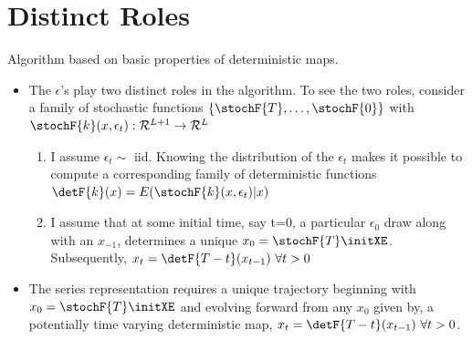 \documentclass[12pt]{article}
\begin{document}
\section{Distinct Roles}
\label{sec:distinct-roles}



  {Algorithm based on basic properties of deterministic maps.}
  \begin{itemize}
  \item     The $\epsilon$'s  play two distinct roles in the algorithm.
To see the two roles, consider a family of stochastic functions 
$\{\stochF{T},\ldots,\stochF{0}\}$ with 
$\stochF{k}(x,\epsilon_t): {\mathcal{R}}^{L+1} \rightarrow \mathcal{R}^L$ 
    \begin{enumerate}
\item I assume  $\epsilon_t \sim $ iid. Knowing the distribution 
of the $\epsilon_t$ makes it possible to compute 
a corresponding family of deterministic functions $\detF{k}(x)=E( \stochF{k}(x,\epsilon_t)|x) $
    \item I assume that at some initial time, say t=0, a particular 
 $\epsilon_0$ draw 
along with an $x_{-1}$, determines a unique $x_0=\stochF{T}\initXE$.
Subsequently, $x_{t}=\detF{{T-t}}(x_{t-1})\,\, \forall t>0$
    \end{enumerate}
 \item The series representation requires a unique trajectory beginning with $x_0=\stochF{T}\initXE$ and 
evolving forward from any $x_0$ given by, a potentially time varying deterministic map,  $x_t=\detF{T-t}(x_{t-1})\,\, \forall t>0$. 
  \end{itemize}
    
\end{document}
